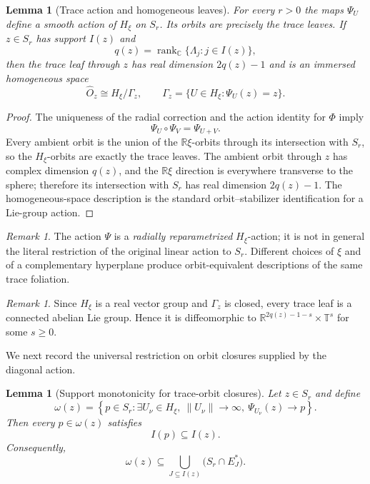 \documentclass[11pt]{amsart}
\newtheorem{lemma}[theorem]{Lemma}
\theoremstyle{definition}
\theoremstyle{remark}
\newtheorem{remark}[theorem]{Remark}
\newcommand{\C}{\mathbb{C}}
\newcommand{\R}{\mathbb{R}}
\newcommand{\T}{\mathbb{T}}
\DeclareMathOperator{\rank}{rank}
\newcommand{\stratSS}[1]{E_{#1}^*}
\begin{document}
\begin{lemma}[Trace action and homogeneous leaves]
	\label{thm:trace-main}
	For every $r>0$ the maps $\Psi_U$ define a smooth action of $H_\xi$ on $S_r$.
	Its orbits are precisely the trace leaves.
	If $z\in S_r$ has support $I(z)$ and
	\[
		q(z)=\rank_{\C}\{\Lambda_j:j\in I(z)\},
	\]
	then the trace leaf through $z$ has real dimension $2q(z)-1$ and is an immersed homogeneous space
	\[
		\widehat O_z\cong H_\xi/\Gamma_z, \qquad \Gamma_z=\{U\in H_\xi:\Psi_U(z)=z\}.
	\]
\end{lemma}

\begin{proof}
	The uniqueness of the radial correction and the action identity for $\Phi$ imply
	\[
		\Psi_U\circ\Psi_V=\Psi_{U+V}.
	\]
	Every ambient orbit is the union of the $\R\xi$-orbits through its
	intersection with $S_r$, so the $H_\xi$-orbits are exactly the trace
	leaves.
	The ambient orbit through $z$ has complex dimension $q(z)$, and the $\R\xi$ direction is everywhere transverse to the sphere; therefore its intersection with $S_r$ has real dimension $2q(z)-1$.
	The homogeneous-space description is the standard orbit--stabilizer identification for a Lie-group action.
\end{proof}

\begin{remark}
	The action $\Psi$ is a \emph{radially reparametrized} $H_\xi$-action; it is not in general the literal restriction of the original linear action to $S_r$.
	Different choices of $\xi$ and of a complementary hyperplane produce orbit-equivalent descriptions of the same trace foliation.
\end{remark}

\begin{remark}
	Since $H_\xi$ is a real vector group and $\Gamma_z$ is closed, every trace leaf is a connected abelian Lie group.
	Hence it is diffeomorphic to $\R^{2q(z)-1-s}\times\T^s$ for some $s\ge0$.
\end{remark}

We next record the universal restriction on orbit closures supplied by the diagonal action.

\begin{lemma}[Support monotonicity for trace-orbit closures]
	\label{thm:omega-strata}
	Let $z\in S_r$ and define
	\[
		\omega(z)=\left\{p\in S_r:\exists U_\nu\in H_\xi,\ \|U_\nu\|\to\infty,\ \Psi_{U_\nu}(z)\to p\right\}.
	\]
	Then every $p\in\omega(z)$ satisfies
	\[
		I(p)\subseteq I(z).
	\]
	Consequently,
	\[
		\omega(z)\subseteq
		\bigcup_{J\subseteq I(z)}\bigl(S_r\cap\stratSS{J}\bigr).
	\]
\end{lemma}
\end{document}
